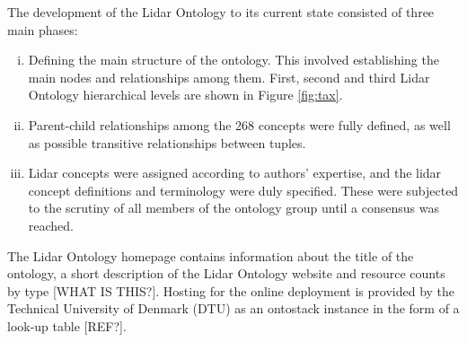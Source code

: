 \documentclass[remotesensing,article,submit,pdftex,moreauthors]{Definitions/mdpi}
\begin{document}
The development of the Lidar Ontology to its current state consisted of three main phases: 
\begin{enumerate}[(i)]

    \item Defining the main structure of the ontology. This involved establishing the main nodes and relationships among them. First, second and third Lidar Ontology hierarchical levels are shown in Figure \ref{fig:tax}. 

    \item Parent-child relationships among the 268 concepts were fully defined, as well as possible transitive relationships between tuples.

    \item
    Lidar concepts were assigned according to authors' expertise, and the lidar concept definitions and terminology were duly specified. These were subjected to the scrutiny of all members of the ontology group until a consensus was reached.

\end{enumerate}

The Lidar Ontology homepage contains information about the title of the ontology, a short description of the Lidar Ontology website and resource counts by type [WHAT IS THIS?]. Hosting for the online deployment is provided by the Technical University of Denmark (DTU) as an ontostack instance in the form of a look-up table \cite{ref-IEA-Wind-Task-32-wind-lidar-ontology}[REF?]. 
\end{document}
